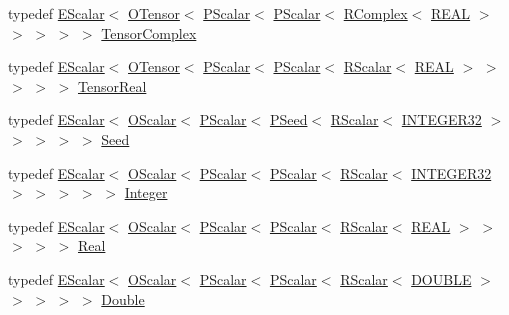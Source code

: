 \begin{DoxyCompactItemize}
\item 
typedef \mbox{\hyperlink{classENSEM_1_1EScalar}{E\+Scalar}}$<$ \mbox{\hyperlink{classENSEM_1_1OTensor}{O\+Tensor}}$<$ \mbox{\hyperlink{classENSEM_1_1PScalar}{P\+Scalar}}$<$ \mbox{\hyperlink{classENSEM_1_1PScalar}{P\+Scalar}}$<$ \mbox{\hyperlink{classENSEM_1_1RComplex}{R\+Complex}}$<$ \mbox{\hyperlink{namespaceENSEM_a6dd9aa6508168f545c861787e63ddd1e}{R\+E\+AL}} $>$ $>$ $>$ $>$ $>$ \mbox{\hyperlink{group__defs_gaa7d4b94401ce3fe4074e5133299e9924}{Tensor\+Complex}}
\item 
typedef \mbox{\hyperlink{classENSEM_1_1EScalar}{E\+Scalar}}$<$ \mbox{\hyperlink{classENSEM_1_1OTensor}{O\+Tensor}}$<$ \mbox{\hyperlink{classENSEM_1_1PScalar}{P\+Scalar}}$<$ \mbox{\hyperlink{classENSEM_1_1PScalar}{P\+Scalar}}$<$ \mbox{\hyperlink{classENSEM_1_1RScalar}{R\+Scalar}}$<$ \mbox{\hyperlink{namespaceENSEM_a6dd9aa6508168f545c861787e63ddd1e}{R\+E\+AL}} $>$ $>$ $>$ $>$ $>$ \mbox{\hyperlink{group__defs_ga958dd8b23f0fe048624bd04c42201408}{Tensor\+Real}}
\item 
typedef \mbox{\hyperlink{classENSEM_1_1EScalar}{E\+Scalar}}$<$ \mbox{\hyperlink{classENSEM_1_1OScalar}{O\+Scalar}}$<$ \mbox{\hyperlink{classENSEM_1_1PScalar}{P\+Scalar}}$<$ \mbox{\hyperlink{classENSEM_1_1PSeed}{P\+Seed}}$<$ \mbox{\hyperlink{classENSEM_1_1RScalar}{R\+Scalar}}$<$ \mbox{\hyperlink{namespaceENSEM_a6a58e5c07422c48c5d547184b36719bf}{I\+N\+T\+E\+G\+E\+R32}} $>$ $>$ $>$ $>$ $>$ \mbox{\hyperlink{group__defs_ga8a5a983ab64ca8f6a5419885bacd4c40}{Seed}}
\item 
typedef \mbox{\hyperlink{classENSEM_1_1EScalar}{E\+Scalar}}$<$ \mbox{\hyperlink{classENSEM_1_1OScalar}{O\+Scalar}}$<$ \mbox{\hyperlink{classENSEM_1_1PScalar}{P\+Scalar}}$<$ \mbox{\hyperlink{classENSEM_1_1PScalar}{P\+Scalar}}$<$ \mbox{\hyperlink{classENSEM_1_1RScalar}{R\+Scalar}}$<$ \mbox{\hyperlink{namespaceENSEM_a6a58e5c07422c48c5d547184b36719bf}{I\+N\+T\+E\+G\+E\+R32}} $>$ $>$ $>$ $>$ $>$ \mbox{\hyperlink{group__defs_gab13d060149cdd80ab40fd8d653f60117}{Integer}}
\item 
typedef \mbox{\hyperlink{classENSEM_1_1EScalar}{E\+Scalar}}$<$ \mbox{\hyperlink{classENSEM_1_1OScalar}{O\+Scalar}}$<$ \mbox{\hyperlink{classENSEM_1_1PScalar}{P\+Scalar}}$<$ \mbox{\hyperlink{classENSEM_1_1PScalar}{P\+Scalar}}$<$ \mbox{\hyperlink{classENSEM_1_1RScalar}{R\+Scalar}}$<$ \mbox{\hyperlink{namespaceENSEM_a6dd9aa6508168f545c861787e63ddd1e}{R\+E\+AL}} $>$ $>$ $>$ $>$ $>$ \mbox{\hyperlink{group__defs_ga5483719647f0554b19174079436486fa}{Real}}
\item 
typedef \mbox{\hyperlink{classENSEM_1_1EScalar}{E\+Scalar}}$<$ \mbox{\hyperlink{classENSEM_1_1OScalar}{O\+Scalar}}$<$ \mbox{\hyperlink{classENSEM_1_1PScalar}{P\+Scalar}}$<$ \mbox{\hyperlink{classENSEM_1_1PScalar}{P\+Scalar}}$<$ \mbox{\hyperlink{classENSEM_1_1RScalar}{R\+Scalar}}$<$ \mbox{\hyperlink{namespaceENSEM_adcbd0de4e9e0e7ef6aa9b681a554e2c5}{D\+O\+U\+B\+LE}} $>$ $>$ $>$ $>$ $>$ \mbox{\hyperlink{group__defs_ga491906b5e5ffc41e1ec145d6ad29eb8b}{Double}}

\end{DoxyCompactItemize}
